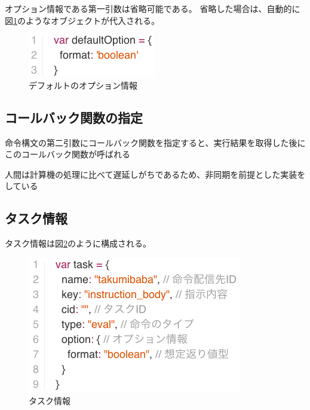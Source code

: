 オプション情報である第一引数は省略可能である。
省略した場合は、自動的に図\ref{fig:option_default}のようなオブジェクトが代入される。

\begin{figure}[htbp]
  \begin{center}
  \includegraphics[width=.4\linewidth,bb=0 0 210 70]{images/option_default.js.png}
  \end{center}
  \caption{デフォルトのオプション情報}
  \label{fig:option_default}
\end{figure}

\subsection{コールバック関数の指定}\label{ux30b3ux30fcux30ebux30d0ux30c3ux30afux95a2ux6570ux306eux6307ux5b9a}

命令構文の第二引数にコールバック関数を指定すると、実行結果を取得した後にこのコールバック関数が呼ばれる

人間は計算機の処理に比べて遅延しがちであるため、非同期を前提とした実装をしている

\subsection{タスク情報}\label{ux30bfux30b9ux30afux60c5ux5831}

タスク情報は図\ref{fig:task_format}のように構成される。

\begin{figure}[htbp]
  \begin{center}
  \includegraphics[width=.6\linewidth,bb=0 0 354 225]{images/task_format.js.png}
  \end{center}
  \caption{タスク情報}
  \label{fig:task_format}
\end{figure}

